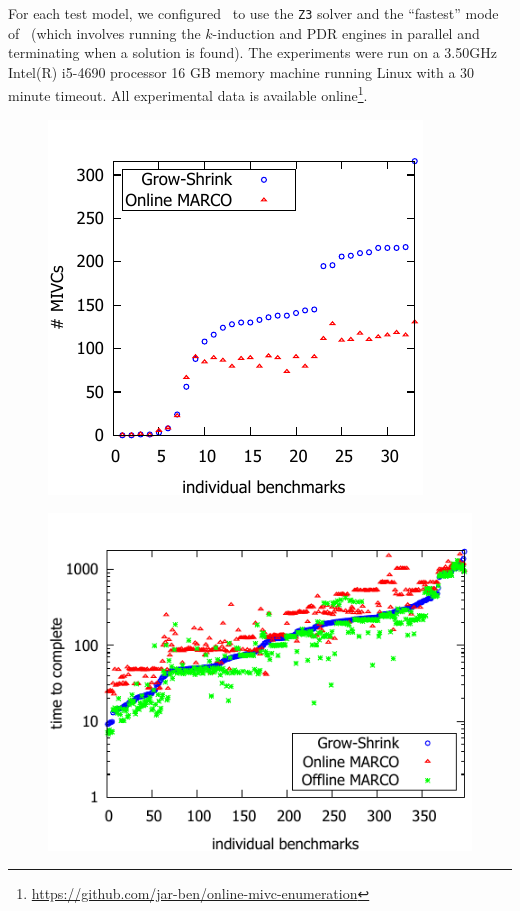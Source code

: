 For each test model, we configured \jkind\ to use the \texttt{Z3} solver and the ``fastest'' mode of \jkind\ (which involves running the $k$-induction and PDR engines in parallel and terminating when a solution is found). The experiments were run on a  3.50GHz  Intel(R) i5-4690 processor 16 GB memory machine running Linux with a 30 minute timeout.  All experimental data is available online\footnote{\url{https://github.com/jar-ben/online-mivc-enumeration}}.




\begin{figure}[!t]
\centering
\begin{minipage}{.4\textwidth}
\centering
\includegraphics[scale=0.8]{./plots/found_mivcs.pdf}%
%
\label{res:found_mivcs}
\end{minipage}\hfill
\begin{minipage}{.52\textwidth}
\centering
\includegraphics[scale=0.8]{./plots/time_to_complete.pdf}%
%
\label{res:time_to_complete}
\end{minipage}
\end{figure}



